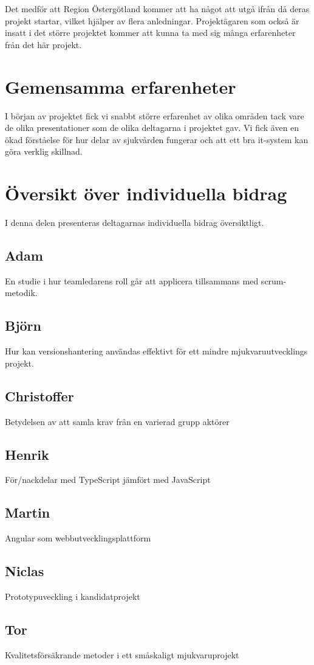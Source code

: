 Det medför att Region Östergötland kommer att ha något att utgå ifrån då deras projekt startar, vilket hjälper av flera anledningar. Projektägaren som också är insatt i det större projektet kommer att kunna ta med sig många erfarenheter från det här projekt.

\section{Gemensamma erfarenheter}
I början av projektet fick vi snabbt större erfarenhet av olika områden
tack vare de olika presentationer som de olika deltagarna i projektet gav.
Vi fick även en ökad förståelse för hur delar av sjukvården fungerar och att ett bra
it-system kan göra verklig skillnad.

\section{Översikt över individuella bidrag}
I denna delen presenteras deltagarnas individuella bidrag översiktligt.

\subsection{Adam}
En studie i hur teamledarens roll går att applicera tillsammans med scrum-metodik.
\subsection{Björn}
Hur kan versionshantering användas effektivt för ett mindre mjukvaruutvecklings projekt.
\subsection{Christoffer}
Betydelsen av att samla krav från en varierad grupp aktörer
\subsection{Henrik}
För/nackdelar med TypeScript jämfört med JavaScript
\subsection{Martin}
Angular som webbutvecklingsplattform
\subsection{Niclas}
Prototypuveckling i kandidatprojekt
\subsection{Tor}
Kvalitetsförsäkrande metoder i ett småskaligt mjukvaruprojekt

